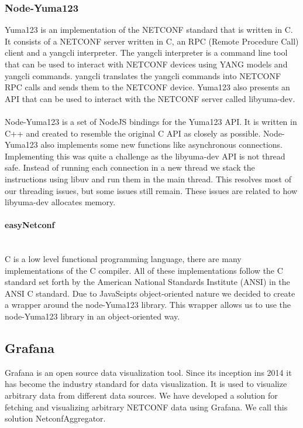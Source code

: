 \documentclass[12pt]{article}
\newcommand{\subsubsubsection}[1]{\paragraph{#1}\mbox{}\\}
\begin{document}
\newpage

\subsubsection{Node-Yuma123}
Yuma123 is an implementation of the NETCONF standard that is written in C.
It consists of a NETCONF server written in C, an RPC (Remote Procedure Call) client 
and a yangcli interpreter. The yangcli interpreter is a command line tool that can be used to
interact with NETCONF devices using YANG models and yangcli commands. yangcli
translates the yangcli commands into NETCONF RPC calls and sends them to the NETCONF device.
Yuma123 also presents an API that can be used to interact with the NETCONF server called 
libyuma-dev.
\\
\\
Node-Yuma123 is a set of NodeJS bindings for the Yuma123 API. It is written in C++ and created
to resemble the original C API as closely as possible. Node-Yuma123 also implements some 
new functions like asynchronous connections. Implementing this was quite a challenge as the 
libyuma-dev API is not thread safe. Instead of running each connection in a new thread we
stack the instructions using libuv \cite{LibuvDocumentation} and run them in the main thread. This 
resolves most of our threading issues, but some issues still remain. 
These issues are related to how libyuma-dev allocates memory.


\subsubsubsection{easyNetconf}
C is a low level functional programming language, there are many implementations of the C compiler.
All of these implementations follow the C standard set forth by the American National Standards Institute 
(ANSI) in the ANSI C standard. Due to JavaScipts object-oriented nature we decided to create 
a wrapper around the node-Yuma123 library. This wrapper allows us to use the node-Yuma123
library in an object-oriented way.

\subsection{Grafana}
Grafana is an open source data visualization tool. Since its inception ins 2014 it has become the industry standard
for data visualization. It is used to visualize arbitrary data from different data sources.
We have developed a solution for fetching and visualizing arbitrary NETCONF data using Grafana.
We call this solution NetconfAggregator.
\end{document}
